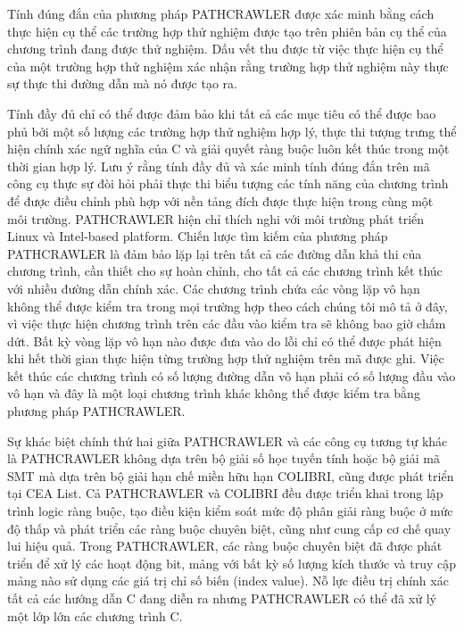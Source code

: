 \documentclass[12pt,a4paper]{article}
\begin{document}
\indent Tính đúng đắn của phương pháp PATHCRAWLER được xác minh bằng cách thực hiện cụ thể các trường hợp thử nghiệm được tạo trên phiên bản cụ thể của chương trình đang được thử nghiệm. Dấu vết thu được từ việc thực hiện cụ thể của một trường hợp thử nghiệm xác nhận rằng trường hợp thử nghiệm này thực sự thực thi đường dẫn mà nó được tạo ra.

\indent Tính đầy đủ chỉ có thể được đảm bảo khi tất cả các mục tiêu có thể được bao phủ bởi một số lượng các trường hợp thử nghiệm hợp lý, thực thi tượng trưng thể hiện chính xác ngữ nghĩa của C và giải quyết ràng buộc luôn kết thúc trong một thời gian hợp lý. Lưu ý rằng tính đầy đủ và xác minh tính đúng đắn trên mã công cụ thực sự đòi hỏi phải thực thi biểu tượng các tính năng của chương trình để được điều chỉnh phù hợp với nền tảng đích được thực hiện trong cùng một môi trường. PATHCRAWLER hiện chỉ thích nghi với môi trường phát triển Linux và Intel-based platform. Chiến lược tìm kiếm của phương pháp PATHCRAWLER là đảm bảo lặp lại trên tất cả các đường dẫn khả thi của chương trình, cần thiết cho sự hoàn chỉnh, cho tất cả các chương trình kết thúc với nhiều đường dẫn chính xác. Các chương trình chứa các vòng lặp vô hạn không thể được kiểm tra trong mọi trường hợp theo cách chúng tôi mô tả ở đây, vì việc thực hiện chương trình trên các đầu vào kiểm tra sẽ không bao giờ chấm dứt. Bất kỳ vòng lặp vô hạn nào được đưa vào do lỗi chỉ có thể được phát hiện khi hết thời gian thực hiện từng trường hợp thử nghiệm trên mã được ghi. Việc kết thúc các chương trình có số lượng đường dẫn vô hạn phải có số lượng đầu vào vô hạn và đây là một loại chương trình khác không thể được kiểm tra bằng phương pháp PATHCRAWLER.

\indent Sự khác biệt chính thứ hai giữa PATHCRAWLER và các công cụ tương tự khác là PATHCRAWLER không dựa trên bộ giải số học tuyến tính hoặc bộ giải mã SMT mà dựa trên bộ giải hạn chế miền hữu hạn COLIBRI, cũng được phát triển tại CEA List. Cả PATHCRAWLER và COLIBRI đều được triển khai trong lập trình logic ràng buộc, tạo điều kiện kiểm soát mức độ phân giải ràng buộc ở mức độ thấp và phát triển các ràng buộc chuyên biệt, cũng như cung cấp cơ chế quay lui hiệu quả.  Trong PATHCRAWLER, các ràng buộc chuyên biệt đã được phát triển để xử lý các hoạt động bit, mảng với bất kỳ số lượng kích thước và truy cập mảng nào sử dụng các giá trị chỉ số biến (index value). Nỗ lực điều trị chính xác tất cả các hướng dẫn C đang diễn ra nhưng PATHCRAWLER có thể đã xử lý một lớp lớn các chương trình C.
\end{document}
